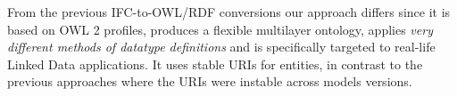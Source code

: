 

From the previous IFC-to-OWL/RDF conversions
\cite{beetz2005ontology,beetz2009ifcowl,pauwels2011interoperability} our approach differs since it
is based on OWL 2 profiles, produces a flexible multilayer ontology, applies \emph{very different methods of data\-type definitions} and is specifically targeted to
real-life Linked Data applications. It uses stable URIs for entities, in contrast to the previous approaches
where the URIs were instable across models versions.

% 
